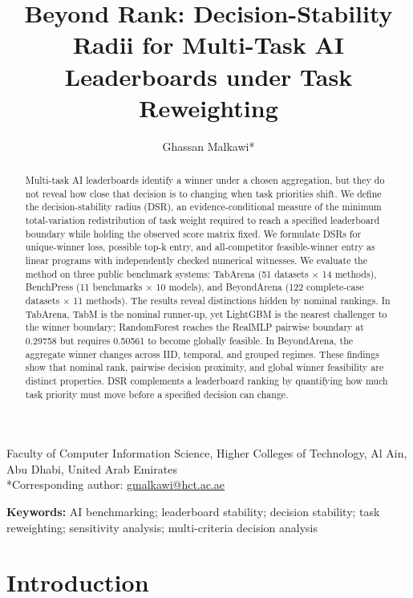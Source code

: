 \documentclass[11pt]{article}
\title{Beyond Rank: Decision-Stability Radii for Multi-Task AI Leaderboards under Task Reweighting}
\author{Ghassan Malkawi*}
\date{}
\begin{document}
\maketitle
\begin{center}
\small
Faculty of Computer Information Science, Higher Colleges of Technology, Al Ain, Abu Dhabi, United Arab Emirates\\
*Corresponding author: \href{mailto:gmalkawi@hct.ac.ae}{gmalkawi@hct.ac.ae}
\end{center}

\begin{abstract}

Multi-task AI leaderboards identify a winner under a chosen aggregation, but they do not reveal how close that decision is to changing when task priorities shift. We define the decision-stability radius (DSR), an evidence-conditional measure of the minimum total-variation redistribution of task weight required to reach a specified leaderboard boundary while holding the observed score matrix fixed. We formulate DSRs for unique-winner loss, possible top-k entry, and all-competitor feasible-winner entry as linear programs with independently checked numerical witnesses. We evaluate the method on three public benchmark systems: TabArena (51 datasets × 14 methods), BenchPress (11 benchmarks × 10 models), and BeyondArena (122 complete-case datasets × 11 methods). The results reveal distinctions hidden by nominal rankings. In TabArena, TabM is the nominal runner-up, yet LightGBM is the nearest challenger to the winner boundary; RandomForest reaches the RealMLP pairwise boundary at 0.29758 but requires 0.50561 to become globally feasible. In BeyondArena, the aggregate winner changes across IID, temporal, and grouped regimes. These findings show that nominal rank, pairwise decision proximity, and global winner feasibility are distinct properties. DSR complements a leaderboard ranking by quantifying how much task priority must move before a specified decision can change.

\end{abstract}

\noindent\textbf{Keywords:} AI benchmarking; leaderboard stability; decision stability; task reweighting; sensitivity analysis; multi-criteria decision analysis

\section{Introduction}
\end{document}
